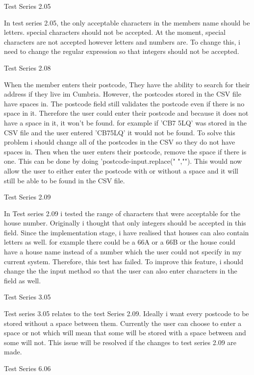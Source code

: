 Test Series 2.05

In test series 2.05, the only acceptable characters in the members name should be letters. special characters should not be accepted. At the moment, special characters are not accepted however letters and numbers are. To change this, i need to change the regular expression so that integers should not be accepted.

Test Series 2.08

When the member enters their postcode, They have the ability to search for their address if they live im Cumbria. However, the postcodes stored in the CSV file have spaces in. The postcode field still validates the postcode even if there is no space in it. Therefore the user could enter their postcode and because it does not have a space in it, it won't be found. for example if 'CB7 5LQ' was stored in the CSV file and the user entered 'CB75LQ' it would not be found. To solve this problem i should change all of the postcodes in the CSV so they do not have spaces in. Then when the user enters their postcode, remove the space if there is one. This can be done by doing 'postcode-input.replace(" ",""). This would now allow the user to either enter the postcode with or without a space and it will still be able to be found in the CSV file.

Test Series 2.09

In Test series 2.09 i tested the range of characters that were acceptable for the house number. Originally i thought that only integers should be accepted in this field. Since the implementation stage, i have realised that houses can also contain letters as well. for example there could be a 66A or a 66B or the house could have a house name instead of a number which the user could not specify in my current system. Therefore,  this test has failed. To improve this feature, i should change the the input method so that the user can also enter characters in the field as well.

Test Series 3.05

Test series 3.05 relates to the test Series 2.09. Ideally i want every postcode to be stored without a space between them. Currently the user can choose to enter a space or not which will mean that some will be stored with a space between and some will not. This issue will be resolved if the changes to test series 2.09 are made.

Test Series 6.06

